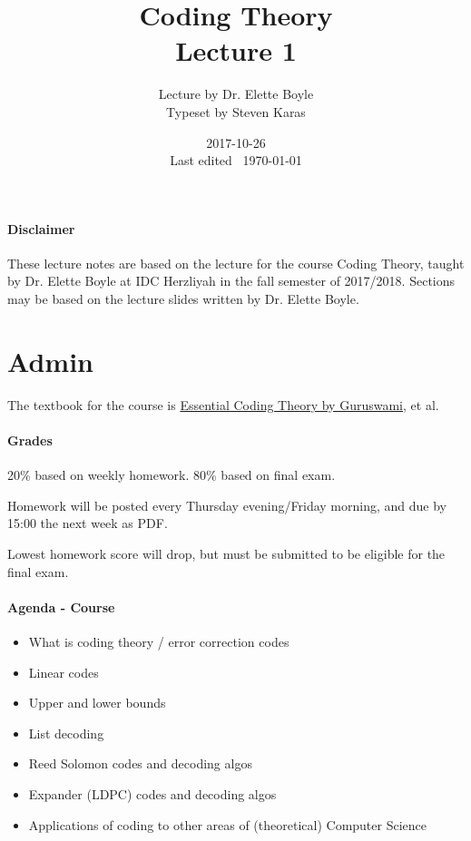 \documentclass{idc_msc}
\title{Coding Theory\\\large Lecture 1}
\date{2017-10-26 \\ Last edited \currenttime\ \today}
\author{Lecture by Dr. Elette Boyle\\Typeset by Steven Karas}
\begin{document}
\maketitle

\paragraph{Disclaimer}

These lecture notes are based on the lecture for the course Coding Theory, taught by Dr. Elette Boyle at IDC Herzliyah in the fall semester of 2017/2018.
Sections may be based on the lecture slides written by Dr. Elette Boyle.

\section{Admin}

The textbook for the course is \href{https://www.cse.buffalo.edu/faculty/atri/courses/coding-theory/book/}{Essential Coding Theory by Guruswami}, et al.

\paragraph{Grades}

20\% based on weekly homework.
80\% based on final exam.

Homework will be posted every Thursday evening/Friday morning, and due by 15:00 the next week as PDF.

Lowest homework score will drop, but must be submitted to be eligible for the final exam.

\paragraph{Agenda - Course}

\begin{itemize}
  \item What is coding theory / error correction codes
  \item Linear codes
  \item Upper and lower bounds
  \item List decoding
  \item Reed Solomon codes and decoding algos
  \item Expander (LDPC) codes and decoding algos
  \item Applications of coding to other areas of (theoretical) Computer Science
\end{itemize}
\end{document}
